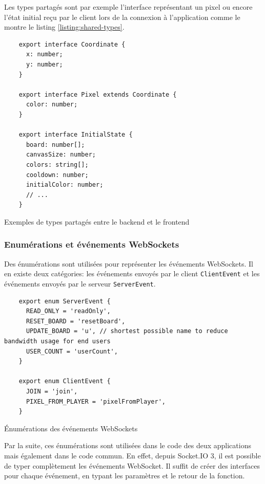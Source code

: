 Les types partagés sont par exemple l'interface représentant un pixel ou encore l'état initial reçu par le client lors de la connexion à l'application comme le montre le listing \ref{listing:shared-types}.

\begin{listing}[H]
  \begin{verbatim}
    export interface Coordinate {
      x: number;
      y: number;
    }

    export interface Pixel extends Coordinate {
      color: number;
    }

    export interface InitialState {
      board: number[];
      canvasSize: number;
      colors: string[];
      cooldown: number;
      initialColor: number;
      // ...
    }
\end{verbatim}
  \caption{Exemples de types partagés entre le backend et le frontend}
  \label{listing:shared-types}
\end{listing}

\subsubsection{Enumérations et événements WebSockets}

Des énumérations sont utilisées pour représenter les événements WebSockets. Il en existe deux catégories: les événements envoyés par le client \texttt{ClientEvent} et les événements envoyés par le serveur \texttt{ServerEvent}.

\begin{listing}[H]
  \begin{verbatim}
    export enum ServerEvent {
      READ_ONLY = 'readOnly',
      RESET_BOARD = 'resetBoard',
      UPDATE_BOARD = 'u', // shortest possible name to reduce bandwidth usage for end users
      USER_COUNT = 'userCount',
    }

    export enum ClientEvent {
      JOIN = 'join',
      PIXEL_FROM_PLAYER = 'pixelFromPlayer',
    }
\end{verbatim}
  \caption{Énumérations des événements WebSockets}
  \label{listing:websocket-events-enums}
\end{listing}

Par la suite, ces énumérations sont utilisées dans le code des deux applications mais également dans le code commun. En effet, depuis Socket.IO 3, il est possible de typer complètement les événements WebSocket. Il suffit de créer des interfaces pour chaque événement, en typant les paramètres et le retour de la fonction.

